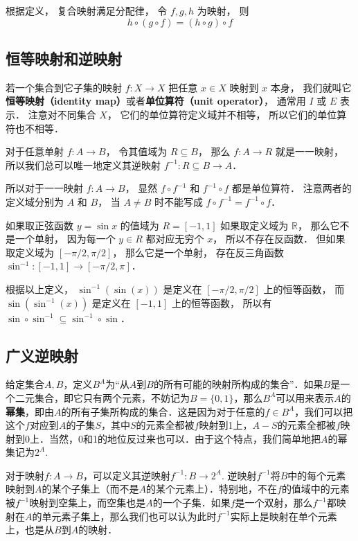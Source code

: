 根据定义， 复合映射满足分配律， 令 $f, g, h$ 为映射， 则
\begin{equation}
h \circ (g \circ f) = (h \circ g) \circ f
\end{equation}

\subsection{恒等映射和逆映射}
若一个集合到它子集的映射 $f:X\to X$ 把任意 $x\in X$ 映射到 $x$ 本身， 我们就叫它\textbf{恒等映射（identity map）}或者\textbf{单位算符（unit operator）}， 通常用 $I$ 或 $E$ 表示． 注意对不同集合 $X$， 它们的单位算符定义域并不相等， 所以它们的单位算符也不相等．

对于任意单射 $f:A\to B$， 令其值域为 $R \subseteq B$， 那么 $f:A\to R$ 就是一一映射， 所以我们总可以唯一地定义其逆映射 $f^{-1}:R \subseteq B \to A$．

所以对于一一映射 $f:A\to B$， 显然 $f\circ f^{-1}$ 和 $f^{-1}\circ f$ 都是单位算符． 注意两者的定义域分别为 $A$ 和 $B$， 当 $A \ne B$ 时不能写成 $f\circ f^{-1} = f^{-1}\circ f$．

\begin{example}{}
如果取正弦函数 $y = \sin x$ 的值域为 $R = [-1, 1]$ 如果取定义域为 $\mathbb R$，  那么它不是一个单射， 因为每一个 $y \in R$ 都对应无穷个 $x$， 所以不存在反函数． 但如果取定义域为 $[-\pi/2, \pi/2]$， 那么它是一个单射， 存在反三角函数 $\sin^{-1}: [-1, 1] \to [-\pi/2, \pi]$．

根据以上定义， $\sin^{-1} (\sin(x))$ 是定义在 $[-\pi/2, \pi/2]$ 上的恒等函数， 而 $\sin (\sin^{-1}(x))$ 是定义在 $[-1, 1]$ 上的恒等函数， 所以有 $\sin \circ \sin^{-1} \subseteq \sin^{-1} \circ \sin$．
\end{example}

\subsection{广义逆映射}

给定集合$A, B$，定义$B^A$为“从$A$到$B$的所有可能的映射所构成的集合”．如果$B$是一个二元集合，即它只有两个元素，不妨记为$B=\{0,1\}$，那么$B^A$可以用来表示$A$的\textbf{幂集}，即由$A$的所有子集所构成的集合．这是因为对于任意的$f\in B^A$，我们可以把这个$f$对应到$A$的子集$S$，其中$S$的元素全都被$f$映射到1上，$A-S$的元素全都被$f$映射到0上．当然，0和1的地位反过来也可以．由于这个特点，我们简单地把$A$的幂集记为$2^A$. 

对于映射$f:A\to B$，可以定义其逆映射$f^{-1}:B→ 2^A$. 逆映射$f^{-1}$将$B$中的每个元素映射到$A$的某个子集上（而不是$A$的某个元素上）．特别地，不在$f$的值域中的元素被$f^{-1}$映射到空集上，而空集也是$A$的一个子集．如果$f$是一个双射，那么$f^{-1}$都映射在$A$的单元素子集上，那么我们也可以认为此时$f^{-1}$实际上是映射在单个元素上，也是从$B$到$A$的映射．

